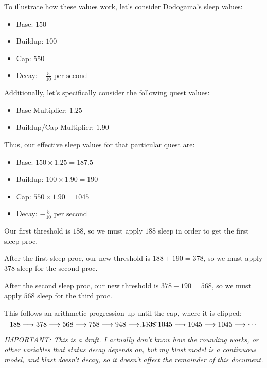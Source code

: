 \documentclass{article}
\begin{document}
To illustrate how these values work, let's consider Dodogama's sleep values:

\begin{itemize}
    \item Base:    $150$
    \item Buildup: $100$
    \item Cap:     $550$
    \item Decay:   $-\frac{5}{10} \text{ per second}$
\end{itemize}

Additionally, let's specifically consider the following quest values:

\begin{itemize}
    \item Base Multiplier: $1.25$
    \item Buildup/Cap Multiplier: $1.90$
\end{itemize}

Thus, our effective sleep values for that particular quest are:

\begin{itemize}
    \item Base:    $150 \times 1.25 = 187.5$
    \item Buildup: $100 \times 1.90 = 190$
    \item Cap:     $550 \times 1.90 = 1045$
    \item Decay:   $-\frac{5}{10} \text{ per second}$
\end{itemize}

Our first threshold is $188$, so we must apply $188$ sleep in order to get the first sleep proc.

After the first sleep proc, our new threshold is $188+190=378$, so we must apply $378$ sleep for the second proc.

After the second sleep proc, our new threshold is $378+190=568$, so we must apply $568$ sleep for the third proc.

This follows an arithmetic progression up until the cap, where it is clipped:
\begin{equation*}
    188
    \longrightarrow 378
    \longrightarrow 568
    \longrightarrow 758
    \longrightarrow 948
    \longrightarrow \cancel{1138} \; 1045
    \longrightarrow 1045
    \longrightarrow 1045
    \longrightarrow \cdots
\end{equation*}

\textit{IMPORTANT: This is a draft. I actually don't know how the rounding works, or other variables that status decay depends on, but my blast model is a continuous model, and blast doesn't decay, so it doesn't affect the remainder of this document.}
\end{document}
